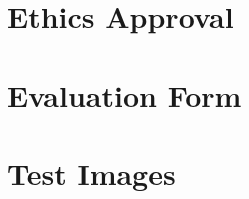 \documentclass{l4proj}
\begin{document}
\begin{appendices}

\chapter{Ethics Approval}\label{ethics_pdf}



\chapter{Evaluation Form}\label{partic}



\chapter{Test Images}


\end{appendices}
\end{document}
